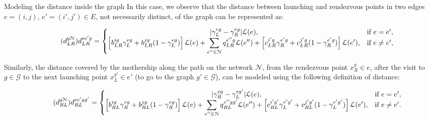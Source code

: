 \documentclass[slidestop,usepdftitle=false,10pt]{beamer}
\begin{document}
	\begin{frame}{Modeling the distance inside the graph}
        In this case, we observe that the distance between launching and rendezvous points in two edges $e=(i,j),\, e'=(i',j')\in E$, not necessarily distinct,  of the graph can be represented as:
        \begin{tiny}
        \begin{equation}\tag{$d^{g\mathcal N}_{LR}$}\label{eq:dLRg}
        d_{LR}^{ee'g} = \left\{\begin{matrix}
        |\gamma_{L}^{eg} - \gamma_{R}^{eg}|\mathcal L(e), & \text{if } e = e',\\
        \left[b_{LR}^{ig}\gamma_{L}^{eg} + b_{LR}^{jg}(1 - \gamma_{L}^{eg})\right]\mathcal L(e) + \displaystyle \sum_{e''\in \mathcal N}q_{LR}^{e''g}\mathcal L(e'') + \left[c_{LR}^{i'g}\gamma_{R}^{e'g} + c_{LR}^{j'g}(1 - \gamma_{R}^{e'g})\right]\mathcal{L}(e'), & \text{if } e \neq e',
        \end{matrix}\right.
        \end{equation}
        \end{tiny}
    	
        Similarly, the distance covered by the mothership along the path on the network $\mathcal{N}$, from the rendezvous point $x_R^g\in e$, after the visit to $g\in \mathcal{G}$ to the next launching point $x_L^{g'}\in e'$ (to go to the graph $g'\in \mathcal{G}$), can be modeled using the following definition of distance:
        
        \begin{tiny}
            \begin{equation}\tag{$d^{g\mathcal N}_{RL}$}\label{eq:dRLg}
            d_{RL}^{ee'gg'} = \left\{\begin{matrix}
            |\gamma_{R}^{eg} - \gamma_{L}^{eg'}|\mathcal L(e), & \text{if } e = e',\\
            \left[b_{RL}^{ig}\gamma_{R}^{eg} + b_{RL}^{jg}(1 - \gamma_{R}^{eg})\right]\mathcal L(e) + \displaystyle \sum_{e''\in \mathcal N}q_{RL}^{e''gg'}\mathcal L(e'') + \left[c_{RL}^{i'g'}\gamma_{L}^{e'g'} + c_{RL}^{j'g'}(1 - \gamma_{L}^{e'g'})\right]\mathcal L(e'), & \text{if } e \neq e'.
            \end{matrix}\right.
            \end{equation}
        \end{tiny}
	\end{frame}
	
\end{document}
